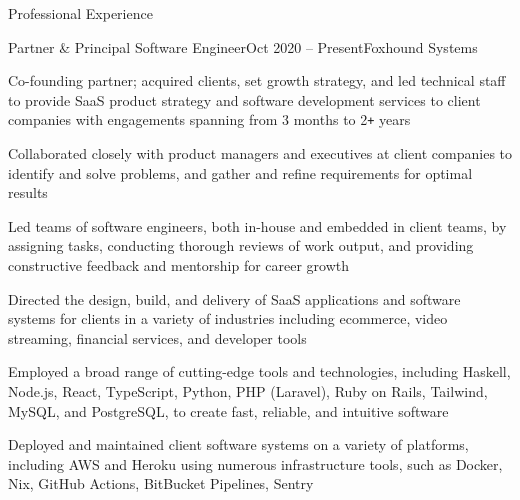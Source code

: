 \documentclass{resume} %
\def\plus{\texttt{+}}
\begin{document}

\begin{rSection}{Professional Experience}

\begin{rSubsection}{Partner \& Principal Software Engineer}{Oct 2020 -- Present}{Foxhound Systems}{}
  \item Co-founding partner; acquired clients, set growth strategy, and led technical staff to provide SaaS product strategy and software development services to client companies with engagements spanning from 3 months to 2{\plus} years
  \item Collaborated closely with product managers and executives at client companies to identify and solve problems, and gather and refine requirements for optimal results
  \item Led teams of software engineers, both in-house and embedded in client teams, by assigning tasks, conducting thorough reviews of work output, and providing constructive feedback and mentorship for career growth
  \item Directed the design, build, and delivery of SaaS applications and software systems for clients in a variety of industries including ecommerce, video streaming, financial services, and developer tools
  \item Employed a broad range of cutting-edge tools and technologies, including Haskell, Node.js, React, TypeScript, Python, PHP (Laravel), Ruby on Rails, Tailwind, MySQL, and PostgreSQL, to create fast, reliable, and intuitive software
  \item Deployed and maintained client software systems on a variety of platforms, including AWS and Heroku using numerous infrastructure tools, such as Docker, Nix, GitHub Actions, BitBucket Pipelines, Sentry
\end{rSubsection}



\end{rSection}
\end{document}

